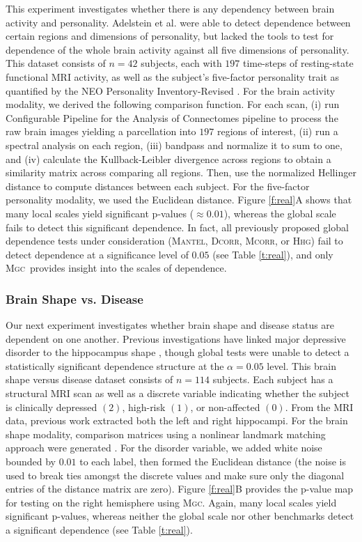 \documentclass[11pt]{article}
\providecommand{\sct}[1]{{\normalfont\textsc{#1}}}
\newcommand{\Mgc}{\sct{Mgc}}
\newcommand{\Hhg}{\sct{Hhg}}
\newcommand{\Dcorr}{\sct{Dcorr}}
\newcommand{\Mcorr}{\sct{Mcorr}}
\newcommand{\Mantel}{\sct{Mantel}}
\begin{document}
This experiment investigates whether there is any dependency between brain activity and personality.
Adelstein et al. \cite{AdelsteinEtAl2011} were able to detect dependence between certain regions and dimensions of personality, but lacked the tools to test for dependence of the whole brain activity against all five dimensions of personality. 
This dataset consists of $n=42$ subjects, each with  $197$ time-steps of resting-state functional MRI activity, as well as the subject's five-factor personality trait as quantified by  the NEO Personality Inventory-Revised  \cite{Costa1992}. 
For the brain activity modality, we derived the following comparison function. For each scan, (i) 
run  Configurable Pipeline for the Analysis of Connectomes pipeline \cite{CPAC2015} to process the raw brain images yielding a parcellation into $197$ regions of interest, 
(ii) run a spectral analysis on each region, (iii) bandpass and normalize it to sum to one, and (iv) calculate the Kullback-Leibler divergence across regions to obtain a similarity matrix across comparing all regions.  Then, use the normalized Hellinger distance to compute distances between each subject. 
For the five-factor personality modality, we  used the Euclidean distance.
% 
Figure \ref{f:real}{\color{magenta}A}  shows that many local scales yield significant p-values ($\approx 0.01$), whereas the global scale fails to detect this significant dependence. In fact, all previously proposed global dependence tests under consideration (\Mantel, \Dcorr, \Mcorr, or \Hhg) fail to detect dependence at a significance level of $0.05$ (see Table \ref{t:real}), and only \Mgc~provides insight into the scales of dependence.

\subsubsection*{Brain Shape vs. Disease} 


Our next experiment investigates whether brain shape and disease status are dependent on one another.  Previous investigations have linked major depressive disorder to the hippocampus shape \cite{ParkEtAl2008,PosenerEtAl2003}, though global tests were unable to detect a statistically significant dependence structure at the $\alpha=0.05$ level.
This brain shape versus disease dataset consists of $n=114$ subjects. Each subject has a structural MRI scan as well as a discrete variable indicating whether the subject is clinically depressed $(2)$, high-risk $(1)$, or non-affected $(0)$.  From the MRI data, previous work extracted both the left and right hippocampi. For the brain shape modality, comparison matrices using a nonlinear landmark matching approach were generated \cite{ParkEtAl2008,BegEtAl2005}. For the  disorder variable, we added white noise bounded by $0.01$ to each label, then formed the Euclidean distance (the noise is used to break ties amongst the discrete values and make sure only the diagonal entries of the distance matrix are zero).
% 
Figure \ref{f:real}{\color{magenta}B} provides the p-value map for testing on the right hemisphere using \Mgc. Again, many local scales yield significant p-values, whereas neither the global scale nor other benchmarks detect a significant dependence  (see Table \ref{t:real}). 
\end{document}
